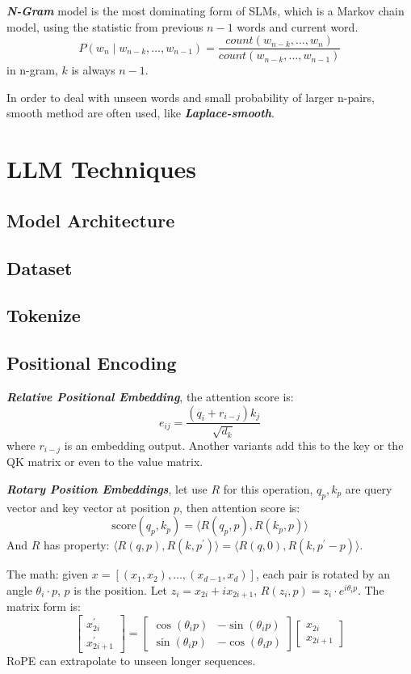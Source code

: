 \documentclass[10pt]{elegantbook}
\newcommand{\mydefination}[1]{\textbf{\textit{\textcolor{structurecolor}{#1}}}}
\begin{document}
\mydefination{N-Gram} model is the most dominating form of SLMs, which is a Markov chain model, using the statistic from
previous $n-1$ words and current word.
\[ P(w_n \mid w_{n-k}, \ldots, w_{n-1}) = \frac{count(w_{n-k}, \ldots, w_{n})}{count(w_{n-k}, \ldots, w_{n-1})} \]
in n-gram, $k$ is always $n-1$.

In order to deal with unseen words and small probability of larger n-pairs, smooth method are often used, like 
\mydefination{Laplace-smooth}.

\chapter{LLM Techniques}

\section{Model Architecture}

\section{Dataset}

\section{Tokenize}

\section{Positional Encoding}

\mydefination{Relative Positional Embedding}, the attention score is:
\[ e_{ij} = \frac{(q_i + r_{i-j})k_j}{\sqrt{d_k}} \]
where $r_{i-j}$ is an embedding output. Another variants add this to the key or the QK matrix or even to the value matrix.

\mydefination{Rotary Position Embeddings}, let use $R$ for this operation, $q_p, k_p$ are query vector and key vector at position $p$, then attention score is:
\[ \text{score}(q_p, k_p) = \langle R(q_p, p), R(k_p, p) \rangle \]
And $R$ has property: $ \langle R(q, p), R(k, p^{'}) \rangle = \langle R(q, 0), R(k, p^{'} - p) \rangle $.

The math: given $x = [(x_1, x_2), \ldots, (x_{d-1}, x_d)]$, each pair is rotated by an angle $\theta_i \cdot p$, $p$ is the position. 
Let $z_i = x_{2i} + ix_{2i+1}$, $R(z_i,p) = z_i \cdot e^{i\theta_i p}$. The matrix form is:
\[
\begin{bmatrix}
x_{2i}^{'} \\
x_{2i + 1}^{'}
\end{bmatrix}
=
\begin{bmatrix}
\cos(\theta_i p) & -\sin(\theta_i p) \\
\sin(\theta_i p) & -\cos(\theta_i p)
\end{bmatrix}
\begin{bmatrix}
x_{2i} \\
x_{2i + 1}
\end{bmatrix}
\]
RoPE can extrapolate to unseen longer sequences.
\end{document}

